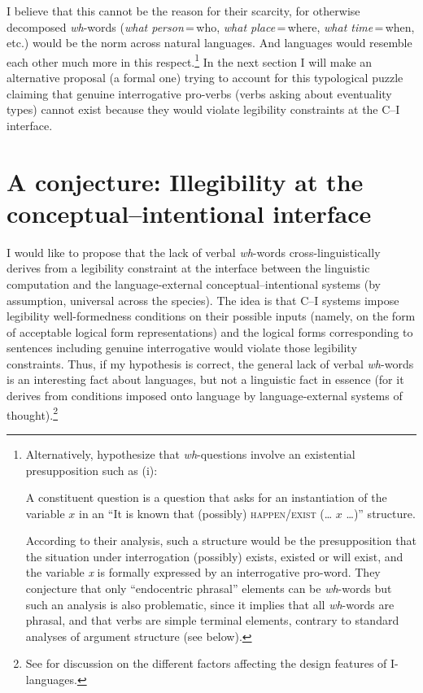 \documentclass[output=paper]{langsci/langscibook}
\begin{document}
I believe that this cannot be the reason for their scarcity, for otherwise
decomposed \emph{wh}-words (\emph{what person}\,=\,who, \emph{what place}\,=\,where,
\emph{what time}\,=\,when, etc.) would be the norm across natural
languages. And languages would resemble each other much more in this
respect.\footnote{Alternatively, \citet{idiatov.vanderauwera2004} hypothesize
    that \emph{wh}-questions involve an existential presupposition such as
    (i):

\begin{exe}
 \label{i} A constituent question is a question that asks for an
instantiation of the variable $x$ in an ``It is known that (possibly) \textsc{happen}\slash\textsc{exist}%
(\dots{} $x$ \dots{})'' structure.
\end{exe}
According to their analysis, such a structure would be the presupposition that
the situation under interrogation (possibly) exists, existed or will exist, and
the variable \emph{x} is formally expressed by an interrogative pro-word. They
conjecture that only ``endocentric phrasal'' elements can be \emph{wh}-words but such an analysis is also problematic, since it implies that all \emph{wh}-words are phrasal, and that verbs are simple terminal elements, contrary to standard analyses of argument structure (see below).}
In the next section I will make an alternative proposal (a formal one) trying
to account for this typological puzzle claiming that genuine interrogative
pro-verbs (verbs asking about eventuality types) cannot exist because they
would violate legibility constraints at the C--I interface.

\section{A conjecture: Illegibility at the conceptual--intentional
interface}\label{sec:3}

I would like to propose that the lack of verbal \emph{wh}-words
cross-linguistically derives from a legibility constraint at the interface
between the linguistic computation and the language-external
conceptual--intentional systems (by assumption, universal across the species).
The idea is that C--I systems impose legibility well-formedness conditions on
their possible inputs (namely, on the form of acceptable logical form
representations) and the logical forms corresponding to sentences including
genuine interrogative  would violate those legibility constraints.
Thus, if my hypothesis is correct, the general lack of verbal \emph{wh}-words
is an interesting fact about languages, but not a linguistic fact in essence
(for it derives from conditions imposed onto language by language-external
systems of thought).\footnote{See
\citet{Chomsky2005,BerwickEtAl2011,Roberts2012,biberauer.roberts2017} for
discussion on the different factors affecting the design features of
I-languages.}
\end{document}
